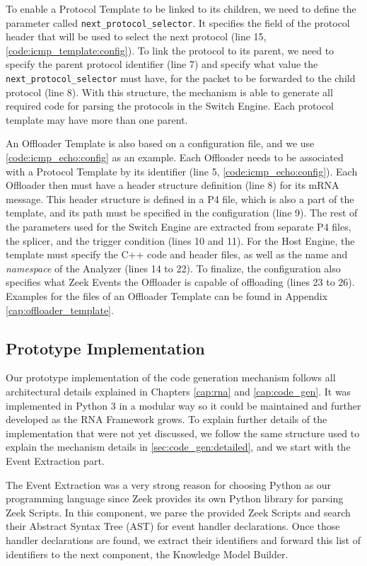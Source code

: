 To enable a Protocol Template to be linked to its children, we need to define the parameter called \texttt{next\_protocol\_selector}. It specifies the field of the protocol header that will be used to select the next protocol (line 15, \autoref{code:icmp_template:config}). To link the protocol to its parent, we need to specify the parent protocol identifier (line 7) and specify what value the \texttt{next\_protocol\_selector} must have, for the packet to be forwarded to the child protocol (line 8). With this structure, the mechanism is able to generate all required code for parsing the protocols in the Switch Engine. Each protocol template may have more than one parent.

An Offloader Template is also based on a configuration file, and we use \autoref{code:icmp_echo:config} as an example. Each Offloader needs to be associated with a Protocol Template by its identifier (line 5, \autoref{code:icmp_echo:config}). Each Offloader then must have a header structure definition (line 8) for its mRNA message. This header structure is defined in a P4 file, which is also a part of the template, and its path must be specified in the configuration (line 9). The rest of the parameters used for the Switch Engine are extracted from separate P4 files, the splicer, and the trigger condition (lines 10 and 11). For the Host Engine, the template must specify the C++ code and header files, as well as the name and \textit{namespace} of the Analyzer (lines 14 to 22). To finalize, the configuration also specifies what Zeek Events the Offloader is capable of offloading (lines 23 to 26). Examples for the files of an Offloader Template can be found in Appendix \ref{cap:offloader_template}.

\subsection{Prototype Implementation}

Our prototype implementation of the code generation mechanism follows all architectural details explained in Chapters \ref{cap:rna} and \ref{cap:code_gen}. It was implemented in Python 3 in a modular way so it could be maintained and further developed as the RNA Framework grows. To explain further details of the implementation that were not yet discussed, we follow the same structure used to explain the mechanism details in \autoref{sec:code_gen:detailed}, and we start with the Event Extraction part.

The Event Extraction was a very strong reason for choosing Python as our programming language since Zeek provides its own Python library for parsing Zeek Scripts. In this component, we parse the provided Zeek Scripts and search their Abstract Syntax Tree (AST) for event handler declarations. Once those handler declarations are found, we extract their identifiers and forward this list of identifiers to the next component, the Knowledge Model Builder.


